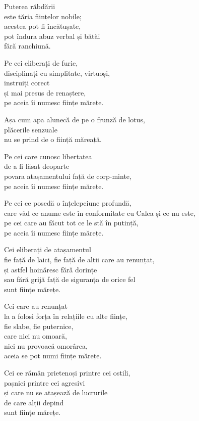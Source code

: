 Puterea răbdării\\
este tăria ființelor nobile;\\
acestea pot fi încătușate,\\
pot îndura abuz verbal și bătăi\\
fără ranchiună.

Pe cei eliberați de furie,\\
disciplinați cu simplitate, virtuoși,\\
instruiți corect\\
și mai presus de renaștere,\\
pe aceia îi numesc ființe mărețe.


Așa cum apa alunecă de pe o frunză de lotus,\\
plăcerile senzuale\\
nu se prind de o ființă măreață.


Pe cei care cunosc libertatea\\
de a fi lăsat deoparte\\
povara atașamentului față de corp-minte,\\
pe aceia îi numesc ființe mărețe.


Pe cei ce posedă o înțelepciune profundă,\\
care văd ce anume este în conformitate cu Calea și ce nu este,\\
pe cei care au făcut tot ce le stă în putință,\\
pe aceia îi numesc ființe mărețe.


Cei eliberați de atașamentul\\
fie față de laici, fie față de alții care au renunțat,\\
și astfel hoinăresc fără dorințe\\
sau fără grijă față de siguranța de orice fel\\
sunt ființe mărețe.


Cei care au renunțat\\
la a folosi forța în relațiile cu alte ființe,\\
fie slabe, fie puternice,\\
care nici nu omoară,\\
nici nu provoacă omorârea,\\
aceia se pot numi ființe mărețe.


Cei ce rămân prietenoși printre cei ostili,\\
pașnici printre cei agresivi\\
și care nu se atașează de lucrurile\\
de care alții depind\\
sunt ființe mărețe.



